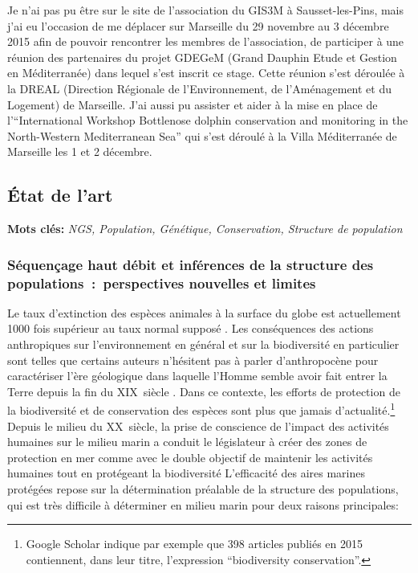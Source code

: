 \documentclass[a4paper,12pt,twoside]{article}\usepackage[]{graphicx}\usepackage[]{color}
\begin{document}
Je n'ai pas pu être sur le site de l'association du GIS3M à Sausset-les-Pins, mais j'ai eu l'occasion de me déplacer sur Marseille du 29 novembre au 3 décembre 2015 afin de pouvoir rencontrer les membres de l'association, de participer à une réunion des partenaires du projet GDEGeM (Grand Dauphin Etude et Gestion en Méditerranée) dans lequel s'est inscrit ce stage. Cette réunion s'est déroulée à la DREAL (Direction Régionale de l'Environnement, de l'Aménagement et du Logement) de Marseille. J'ai aussi pu assister et aider à la mise en place de l'``International Workshop Bottlenose dolphin conservation and monitoring in the North-Western Mediterranean Sea'' qui s'est déroulé à la Villa Méditerranée de Marseille les 1 et 2 décembre.


\newpage


\begin {bibunit} [newbst]

\part*{État de l'art}


\textbf{Mots clés:} \emph{NGS, Population, Génétique, Conservation, Structure de population}

\section{Séquençage haut débit et inférences de la structure des populations~:~perspectives nouvelles et limites}

Le taux d'extinction des espèces animales à la surface du globe est actuellement 1000 fois supérieur au taux normal supposé \citep{pimm2014aa}. Les conséquences des actions anthropiques sur l'environnement en général et sur la biodiversité en particulier sont telles que certains auteurs n'hésitent pas à parler d'anthropocène pour caractériser l'ère géologique dans laquelle l'Homme semble avoir fait entrer la Terre depuis la fin du XIX\ieme{}~siècle \citep{crutzen23ff}. Dans ce contexte, les efforts de protection de la biodiversité et de conservation des espèces sont plus que jamais d'actualité.\footnote{Google Scholar indique par exemple que 398 articles publiés en 2015 contiennent, dans leur titre, l'expression ``biodiversity conservation''.} Depuis le milieu du XX\ieme{}~siècle, la prise de conscience de l'impact des activités humaines sur le milieu marin a conduit le législateur à créer des zones de protection en mer comme avec le double objectif de maintenir les activités humaines tout en protégeant la biodiversité \citep{frost2016} L'efficacité des aires marines protégées repose sur la détermination préalable de la structure des populations, qui est très difficile à déterminer en milieu marin \citep{Jonsson2016} pour deux raisons principales:


\end{bibunit}
\end{document}
